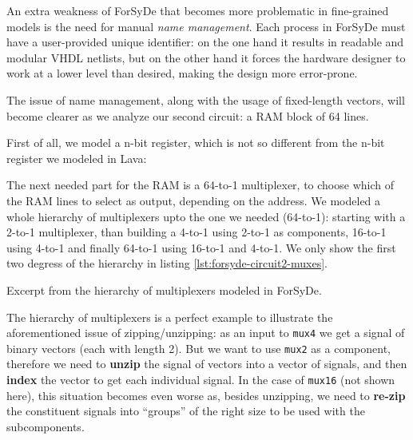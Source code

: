 \documentclass[a4paper]{article}
\begin{document}
                An extra weakness of ForSyDe that becomes more problematic in fine-grained models is
                the need for manual \emph{name management}. Each process in ForSyDe must have a
                user-provided unique identifier: on the one hand it results in readable and modular
                VHDL netlists, but on the other hand it forces the hardware designer to work at a
                lower level than desired, making the design more error-prone.

                The issue of name management, along with the usage of fixed-length vectors, will
                become clearer as we analyze our second circuit: a RAM block of 64 lines.

                First of all, we model a n-bit register, which is not so different from the n-bit
                register we modeled in Lava:


                The next needed part for the RAM is a 64-to-1 multiplexer, to choose which of the
                RAM lines to select as output, depending on the address. We modeled a whole
                hierarchy of multiplexers upto the one we needed (64-to-1): starting with a 2-to-1
                multiplexer, than building a 4-to-1 using 2-to-1 as components, 16-to-1 using 4-to-1
                and finally 64-to-1 using 16-to-1 and 4-to-1. We only show the first two degress
                of the hierarchy in listing \ref{lst:forsyde-circuit2-muxes}.

                \begin{listing}[h!]
                    \caption{Excerpt from the hierarchy of multiplexers modeled in ForSyDe.
                        \label{lst:forsyde-circuit2-muxes}}
                \end{listing}

                The hierarchy of multiplexers is a perfect example to illustrate the aforementioned
                issue of zipping/unzipping: as an input to \texttt{mux4} we get a signal of binary
                vectors (each with length 2). But we want to use \texttt{mux2} as a component,
                therefore we need to \textbf{unzip} the signal of vectors into a vector of signals,
                and then \textbf{index} the vector to get each individual signal. In the case of
                \texttt{mux16} (not shown here), this situation becomes even worse as, besides
                unzipping, we need to \textbf{re-zip} the constituent signals into ``groups'' of the
                right size to be used with the subcomponents.
\end{document}
